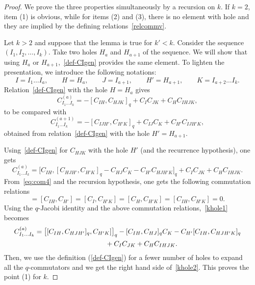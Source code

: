 \documentclass[10pt,a4paper]{amsart}
\numberwithin{equation}{section}
\theoremstyle{definition}
\begin{document}
\begin{proof}
We prove the three properties simultaneously by a recursion on $k$.
If $k=2$, item (1) is obvious, while for items (2) and (3), there is no element with hole and they are implied by the defining relations~\eqref{relcommv}.

Let $k>2$ and suppose that the lemma is true for $k'\!<k$. Consider the sequence $(I_1,I_2,\dots, I_{k})$.
Take two holes $H_a$ and $H_{a+1}$ of the sequence. We will show that using $H_a$ or $H_{a+1}$,~\eqref{def-CIgen} provides the same element.
To lighten the presentation, we introduce the following notations:
\begin{equation*}
 I=I_1\dots I_a ,\qquad H=H_a ,\qquad J=I_{a+1} ,\qquad H'=H_{a+1} ,\qquad K=I_{a+2}\dots I_k .
\end{equation*}
Relation~\eqref{def-CIgen} with the hole $H=H_a$ gives
\begin{equation*}
C^{(a)}_{I_1\dots I_k}=-[C_{IH},C_{HJK}]_q+C_{I}C_{JK}+C_{H}C_{IHJK} ,
\end{equation*}
to be compared with
\begin{equation}\label{khole2}
C^{(a+1)}_{I_1\dots I_k}=-[C_{IJH'},C_{H'K}]_q+ C_{IJ}C_{K}+C_{H'}C_{IJH'K} ,
\end{equation}
obtained from relation~\eqref{def-CIgen} with the hole $H'=H_{a+1}$.

Using~\eqref{def-CIgen} for $C_{HJK}$ with the hole $H'$ (and the recurrence hypothesis), one gets
\begin{equation}\label{khole1}
C^{(a)}_{I_1\dots I_k}=\big[C_{IH},[C_{HJH'},C_{H'K}]_q-C_{HJ}C_{K}-C_{H'}C_{HJH'K}\big]_q+C_{I}C_{JK}+C_{H}C_{IHJK} .
\end{equation}
From~\eqref{eq:com4} and the recursion hypothesis, one gets the following commutation relations
\begin{equation*}
 [C_{IH},C_{K}]=[C_{IH},C_{H'}]=[C_{I},C_{H'K}]=[C_{H},C_{H'K}]=[C_{IH},C_{H'K}]=0 .
\end{equation*}
Using the $q$-Jacobi identity and the above commutation relations,~\eqref{khole1} becomes
\begin{gather*}%
C^{(a)}_{I_1\dots I_k}=\big[[C_{IH},C_{HJH'}]_q,C_{H'K}]\big]_q -[C_{IH},C_{HJ}]_q C_{K}-C_{H'}[C_{IH},C_{HJH'K}]_q \\
\hphantom{C^{(a)}_{I_1\dots I_k}=}{}+C_{I}C_{JK}+C_{H}C_{IHJK} .
\end{gather*}
Then, we use the definition (\ref{def-CIgen}) for a fewer number of holes to expand all the $q$-commutators
and we get the right hand side of~\eqref{khole2}. This proves the point (1) for $k$.


\end{proof}
\end{document}
